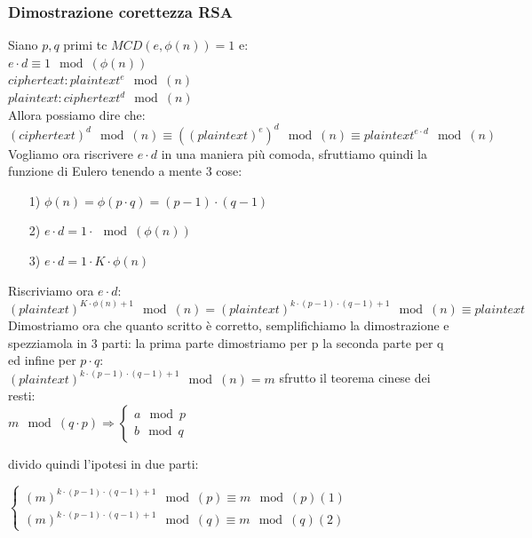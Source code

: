 \documentclass[10pt,a4paper]{article}
\begin{document}
\subsubsection{Dimostrazione corettezza RSA}

Siano $p,q$ primi tc $MCD(e,\phi(n))=1$ e:\\
$e\cdot d \equiv 1 \mod(\phi(n))$\\
$ciphertext: plaintext^e \mod(n)$\\
$plaintext: ciphertext^d \mod(n)$\\
Allora possiamo dire che:
$(ciphertext)^d \mod(n) \equiv ((plaintext)^e)^d \mod(n) \equiv plaintext^{e\cdot d} \mod(n)$\\
Vogliamo ora riscrivere $e \cdot d$ in una maniera più comoda, sfruttiamo quindi la funzione di Eulero tenendo a mente 3 cose:\\
\begin{itemize}
\item[1)]$\phi(n) = \phi(p\cdot q) = (p-1)\cdot(q-1)$
\item[2)]$e\cdot d = 1 \cdot \mod(\phi(n))$
\item[3)]$e\cdot d = 1 \cdot K\cdot \phi(n)$
\end{itemize}
Riscriviamo ora $e \cdot d$:\\
$(plaintext)^{K \cdot \phi(n)+1}\mod(n) = (plaintext)^{k\cdot(p-1)\cdot(q-1)+1}\mod(n)\equiv plaintext$\\
Dimostriamo ora che quanto scritto è corretto, semplifichiamo la dimostrazione e spezziamola in 3 parti: la prima parte dimostriamo per p la seconda parte per q ed infine per $p\cdot q$:\\
$(plaintext)^{k\cdot(p-1)\cdot(q-1)+1}\mod(n)=m$ sfrutto il teorema cinese dei resti:\\
$m\mod(q\cdot p) \Rightarrow \begin{cases}a\mod p \\b\mod q\end{cases}$

divido quindi l'ipotesi in due parti:
\begin{center}
$\begin{cases}
(m)^{k\cdot(p-1)\cdot(q-1)+1}\mod(p)\equiv m \mod(p) (1)\\
(m)^{k\cdot(p-1)\cdot(q-1)+1}\mod(q)\equiv m \mod(q) (2)
\end{cases}
$\\
\end{center}
\end{document}
